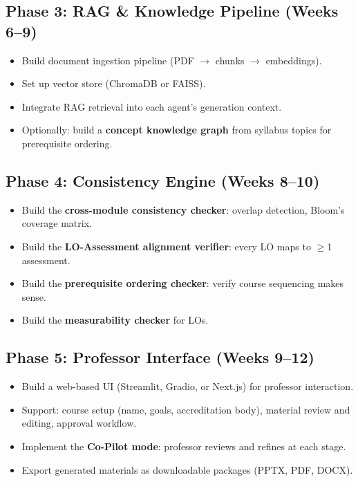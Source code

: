 \documentclass[11pt,a4paper]{article}
\begin{document}
\subsection{Phase 3: RAG \& Knowledge Pipeline (Weeks 6--9)}
\begin{itemize}[nosep]
    \item Build document ingestion pipeline (PDF $\to$ chunks $\to$ embeddings).
    \item Set up vector store (ChromaDB or FAISS).
    \item Integrate RAG retrieval into each agent's generation context.
    \item Optionally: build a \textbf{concept knowledge graph} from syllabus topics for prerequisite ordering.
\end{itemize}

\subsection{Phase 4: Consistency Engine (Weeks 8--10)}
\begin{itemize}[nosep]
    \item Build the \textbf{cross-module consistency checker}: overlap detection, Bloom's coverage matrix.
    \item Build the \textbf{LO-Assessment alignment verifier}: every LO maps to $\geq$1 assessment.
    \item Build the \textbf{prerequisite ordering checker}: verify course sequencing makes sense.
    \item Build the \textbf{measurability checker} for LOs.
\end{itemize}

\subsection{Phase 5: Professor Interface (Weeks 9--12)}
\begin{itemize}[nosep]
    \item Build a web-based UI (Streamlit, Gradio, or Next.js) for professor interaction.
    \item Support: course setup (name, goals, accreditation body), material review and editing, approval workflow.
    \item Implement the \textbf{Co-Pilot mode}: professor reviews and refines at each stage.
    \item Export generated materials as downloadable packages (PPTX, PDF, DOCX).
\end{itemize}
\end{document}
